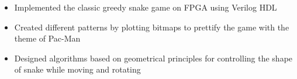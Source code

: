 \documentclass[11pt,a4paper,sans]{moderncv}   %
\begin{document}
{%
\begin{itemize}%
\item Implemented the classic greedy snake game on FPGA using Verilog HDL%
\item Created different patterns by plotting bitmaps to prettify the game with the theme of Pac-Man
\item Designed algorithms based on geometrical principles for controlling the shape of snake while moving and rotating
\end{itemize}
}



\renewcommand{\listitemsymbol}{-~}            %


\nocite{*}



\end{document}
